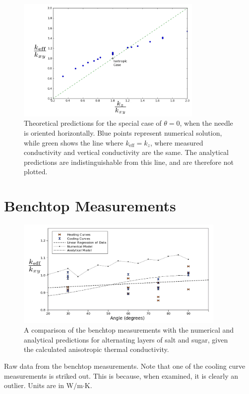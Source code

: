 \begin{figure}[h]
\centering
\includegraphics[width=0.8\textwidth]{fig/angle_0.png}
\caption{Theoretical predictions for the special case of \(\theta = 0 \),
when the needle is oriented horizontally. Blue points represent numerical solution, while green shows the line where \(k_{\textrm{eff}} = k_z\), where measured conductivity and vertical conductivity are the same. The analytical predictions are indistinguishable from this line, and are therefore not plotted.}
\label{fig:angle0}
\end{figure}


\section{Benchtop Measurements}

\begin{figure}[h]
\centering
\includegraphics[width=0.9\textwidth]{fig/test_results.png}
\caption{A comparison of the benchtop measurements with the numerical and
analytical predictions for alternating layers of salt and sugar, given the
calculated anisotropic thermal conductivity.}
\label{fig:test_results}
\end{figure}

\begin{table}[h]
\centering

\caption{Raw data from the benchtop measurements. Note that one of the cooling curve measurements is striked out. This is because, when examined, it is clearly an outlier. Units are in W\(/\)m\(\cdot\)K.}
\label{tab:powders}
\end{table}


